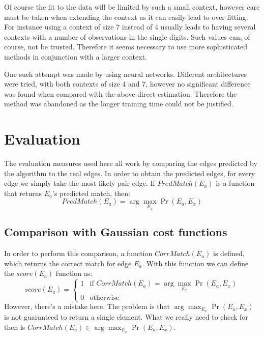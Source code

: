 Of course the fit to the data will be limited by such a small context, however care must be taken when extending the context as it can easily lead to over-fitting. For instance using a context of size 7 instead of 4 usually leads to having several contexts with a number of observations in the single digits. Such values can, of course, not be trusted. Therefore it seems necessary to use more sophisticated methods in conjunction with a larger context. 

One such attempt was made by using neural networks. Different architectures were tried, with both contexts of size 4 and 7, however no significant difference was found when compared with the above direct estimation. Therefore the method was abandoned as the longer training time could not be justified. 

\section{Evaluation}

The evaluation measures used here all work by comparing the edges predicted by the algorithm to the real edges. In order to obtain the predicted edges, for every edge we simply take the most likely pair edge. If \(PredMatch(E_a)\) is a function that returns \(E_a\)'s predicted match, then:
\[PredMatch(E_a) = \arg\max_{E_x} \Pr(E_a,E_x) \]

\subsection{Comparison with Gaussian cost functions}
In order to perform this comparison, a function \(CorrMatch(E_a)\) is defined, which returns the correct match for edge $E_a$. With this function we can define the \(score(E_a)\) function as:
\[
score(E_a) =
\left\{
	\begin{array}{ll}
		1  & \mbox{if } CorrMatch(E_a) = \arg\max_{E_x} \Pr(E_a,E_x) \\
		0 & \mbox{otherwise } 
	\end{array}
\right.
\]
However, there's a mistake here. The problem is that \(\arg\max_{E_x} \Pr(E_a,E_x)\) is not guaranteed to return a single element. What we really need to check for then is \( CorrMatch(E_a) \in \arg\max_{E_x} \Pr(E_a,E_x) \). 

